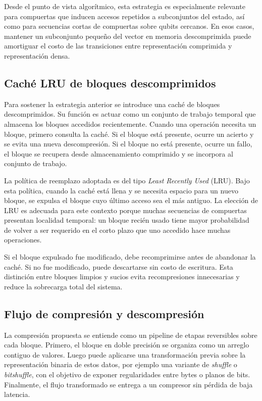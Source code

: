 Desde el punto de vista algorítmico, esta estrategia es especialmente relevante para compuertas que inducen accesos repetidos a subconjuntos del
estado, así como para secuencias cortas de compuertas sobre qubits cercanos. En esos casos, mantener un subconjunto pequeño del vector en memoria
descomprimida puede amortiguar el costo de las transiciones entre representación comprimida y representación densa.

\subsection{Caché LRU de bloques descomprimidos}

Para sostener la estrategia anterior se introduce una caché de bloques descomprimidos. Su función es actuar como un conjunto de trabajo temporal
que almacena los bloques accedidos recientemente. Cuando una operación necesita un bloque, primero consulta la caché. Si el bloque está presente,
ocurre un acierto y se evita una nueva descompresión. Si el bloque no está presente, ocurre un fallo, el bloque se recupera desde almacenamiento
comprimido y se incorpora al conjunto de trabajo.

La política de reemplazo adoptada es del tipo \emph{Least Recently Used} (LRU). Bajo esta política, cuando la caché está llena y se necesita espacio
para un nuevo bloque, se expulsa el bloque cuyo último acceso sea el más antiguo. La elección de LRU es adecuada para este contexto porque muchas
secuencias de compuertas presentan localidad temporal: un bloque recién usado tiene mayor probabilidad de volver a ser requerido en el corto plazo
que uno accedido hace muchas operaciones.

Si el bloque expulsado fue modificado, debe recomprimirse antes de abandonar la caché. Si no fue modificado, puede descartarse sin costo de escritura.
Esta distinción entre bloques limpios y sucios evita recompresiones innecesarias y reduce la sobrecarga total del sistema.

\subsection{Flujo de compresión y descompresión}

La compresión propuesta se entiende como un pipeline de etapas reversibles sobre cada bloque. Primero, el bloque en doble precisión se organiza como
un arreglo contiguo de valores. Luego puede aplicarse una transformación previa sobre la representación binaria de estos datos, por ejemplo una
variante de \emph{shuffle} o \emph{bitshuffle}, con el objetivo de exponer regularidades entre bytes o planos de bits. Finalmente, el flujo transformado
se entrega a un compresor sin pérdida de baja latencia.


